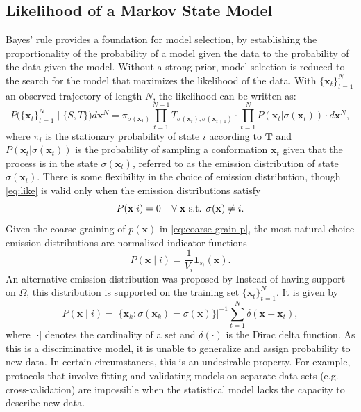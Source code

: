 \documentclass[journal=jpcbfk, layout=traditional, manuscript=article]{achemso}
\begin{document}
\subsection{Likelihood of a Markov State Model}
Bayes' rule provides a foundation for model selection, by establishing the proportionality of the probability of a model given the data to the probability of the data given the model. Without a strong prior, model selection is reduced to the search for the model that maximizes the likelihood of the data. 
With $\{\mathbf{x}_t\}_{t=1}^N$ an observed trajectory of length $N$, the likelihood can be written as:
\begin{equation}
P\big(\{\mathbf{x}_t\}_{t=1}^N\;\big|\; \{S, T\}\big)d\mathbf{x}^N = \pi_{\sigma(\mathbf{x}_1)}\prod_{t=1}^{N-1} T_{\sigma(\mathbf{x}_t), \sigma(\mathbf{x}_{t+1})} \cdot \prod_{t=1}^{N} P(\mathbf{x}_t | \sigma(\mathbf{x}_t)) \cdot d\mathbf{x}^N,
\label{eq:like}
\end{equation} 
where $\pi_i$ is the stationary probability of state $i$ according to $\mathbf{T}$ and $P(\mathbf{x}_t | \sigma(\mathbf{x}_t))$ is the probability of sampling a conformation $\mathbf{x}_t$ given that the process is in the state $\sigma(\mathbf{x}_t)$, referred to as the emission distribution of state $\sigma(\mathbf{x}_t)$. There is some flexibility in the choice of emission distribution, though \cref{eq:like} is valid only when the emission distributions satisfy
\begin{equation}
P(\mathbf{x} | i) = 0 \;\;\;\; \forall \; \mathbf{x} \textnormal{ s.t. } \sigma(\mathbf{x}) \neq i.
\end{equation}
Given the coarse-graining of $p(\mathbf{x})$ in \cref{eq:coarse-grain-p}, the most natural choice emission distributions are normalized indicator functions
\begin{equation}
P(\mathbf{x} \;|\; i) = \frac{1}{V_i} \mathbf{1}_{s_i}(\mathbf{x}).
\end{equation}
An alternative emission distribution was proposed by \citet{Kellogg2012Evaluation} Instead of having support on $\Omega$, this distribution is supported on the training set $\{\mathbf{x}_t\}_{t=1}^N$. It is given by
\begin{equation}
P(\mathbf{x} \;|\; i) = \big| \{ \mathbf{x}_k : \sigma(\mathbf{x}_k) = \sigma(\mathbf{x}) \} \big|^{-1} \sum_{t=1}^N \delta(\mathbf{x}-\mathbf{x}_t),
\end{equation} where $| \cdot |$ denotes the cardinality of a set and $\delta(\cdot)$ is the Dirac delta function. As this is a discriminative model, it is unable to generalize and assign probability to new data. In certain circumstances, this is an undesirable property. For example, protocols that involve fitting and validating models on separate data sets (e.g. cross-validation) are impossible when the statistical model lacks the capacity to describe new data.
\end{document}
